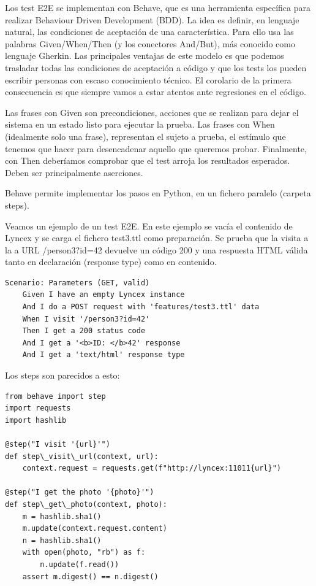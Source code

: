 \documentclass[openright,twoside,12pt]{book}
\begin{document}
Los test E2E se implementan con Behave, que es una herramienta específica para realizar Behaviour Driven Development (BDD). La idea es definir, en lenguaje natural, las condiciones de aceptación de una característica. Para ello usa las palabras Given/When/Then (y los conectores And/But), más conocido como lenguaje Gherkin. Las principales ventajas de este modelo es que podemos trasladar todas las condiciones de aceptación a código y que los tests los pueden escribir personas con escaso conocimiento técnico. El corolario de la primera consecuencia es que siempre vamos a estar atentos ante regresiones en el código.

Las frases con Given son precondiciones, acciones que se realizan para dejar el sistema en un estado listo para ejecutar la prueba. Las frases con When (idealmente solo una frase), representan el sujeto a prueba, el estímulo que tenemos que hacer para desencadenar aquello que queremos probar. Finalmente, con Then deberíamos comprobar que el test arroja los resultados esperados. Deben ser principalmente aserciones.

Behave permite implementar los pasos en Python, en un fichero paralelo (carpeta steps).

Veamos un ejemplo de un test E2E. En este ejemplo se vacía el contenido de Lyncex y se carga el fichero test3.ttl como preparación. Se prueba que la visita a la a URL /person3?id=42 devuelve un código 200 y una respuesta HTML válida tanto en declaración (response type) como en contenido.

\begin{lstlisting}
Scenario: Parameters (GET, valid)
    Given I have an empty Lyncex instance
    And I do a POST request with 'features/test3.ttl' data
    When I visit '/person3?id=42'
    Then I get a 200 status code
    And I get a '<b>ID: </b>42' response
    And I get a 'text/html' response type
\end{lstlisting}

Los steps son parecidos a esto:
\begin{lstlisting}
from behave import step
import requests
import hashlib

@step("I visit '{url}'")
def step\_visit\_url(context, url):
    context.request = requests.get(f"http://lyncex:11011{url}")

@step("I get the photo '{photo}'")
def step\_get\_photo(context, photo):
    m = hashlib.sha1()
    m.update(context.request.content)
    n = hashlib.sha1()
    with open(photo, "rb") as f:
        n.update(f.read())
    assert m.digest() == n.digest()
\end{lstlisting}
\end{document}
